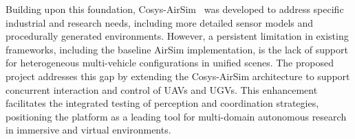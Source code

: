 Building upon this foundation, Cosys-AirSim~\cite{jansen2023cosys} was developed to address specific industrial and research needs, including more detailed sensor models and procedurally generated environments. However, a persistent limitation in existing frameworks, including the baseline AirSim implementation, is the lack of support for heterogeneous multi-vehicle configurations in unified scenes.
The proposed project addresses this gap by extending the Cosys-AirSim architecture to support concurrent interaction and control of UAVs and UGVs. This enhancement facilitates the integrated testing of perception and coordination strategies, positioning the platform as a leading tool for multi-domain autonomous research in immersive and virtual environments.
